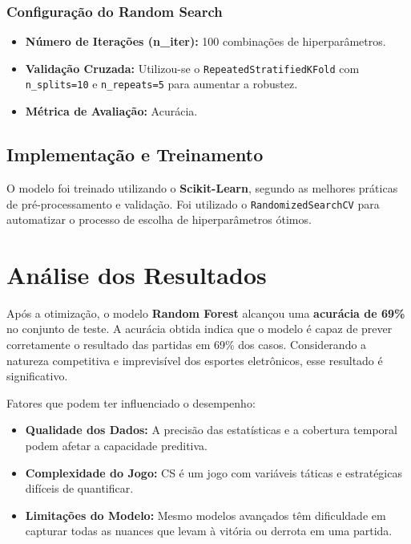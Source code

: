 \documentclass[a4paper,times,12pt]{article}
\begin{document}
\subsubsection*{Configuração do Random Search}
\begin{itemize}
  \item \textbf{Número de Iterações (n\_iter):} 100 combinações de hiperparâmetros.
  \item \textbf{Validação Cruzada:} Utilizou-se o \texttt{RepeatedStratifiedKFold} com \texttt{n\_splits=10} e \texttt{n\_repeats=5} para aumentar a robustez.
  \item \textbf{Métrica de Avaliação:} Acurácia.
\end{itemize}

\subsection{Implementação e Treinamento}

\hspace{+15pt}
O modelo foi treinado utilizando o \textbf{Scikit-Learn}, segundo as melhores práticas de pré-processamento e validação. Foi utilizado o \texttt{RandomizedSearchCV} para automatizar o processo de escolha de hiperparâmetros ótimos.

\section{Análise dos Resultados}
\hspace{+15pt}
Após a otimização, o modelo \textbf{Random Forest} alcançou uma \textbf{acurácia de 69\%} no conjunto de teste.
A acurácia obtida indica que o modelo é capaz de prever corretamente o resultado das partidas em 69\% dos casos. Considerando a natureza competitiva e imprevisível dos esportes eletrônicos, esse resultado é significativo.

Fatores que podem ter influenciado o desempenho:
\begin{itemize}
  \item \textbf{Qualidade dos Dados:} A precisão das estatísticas e a cobertura temporal podem afetar a capacidade preditiva.
  \item \textbf{Complexidade do Jogo:} CS é um jogo com variáveis táticas e estratégicas difíceis de quantificar.
  \item \textbf{Limitações do Modelo:} Mesmo modelos avançados têm dificuldade em capturar todas as nuances que levam à vitória ou derrota em uma partida.
\end{itemize}
\end{document}
